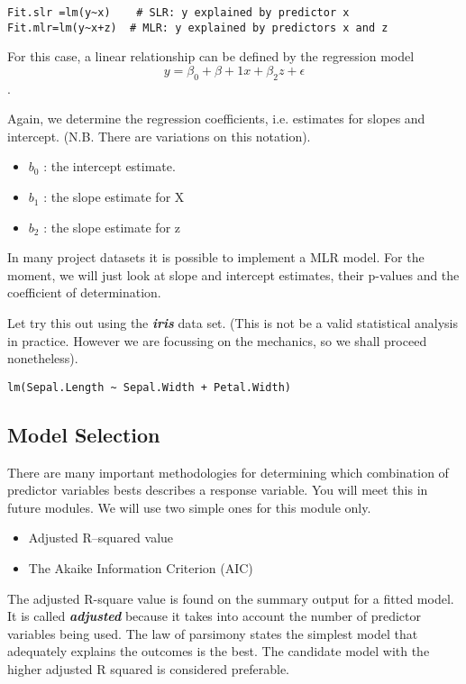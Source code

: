 \documentclass[a4paper,12pt]{article}
\begin{document}
\begin{framed}
\begin{verbatim}
Fit.slr =lm(y~x)  	# SLR: y explained by predictor x
Fit.mlr=lm(y~x+z)  # MLR: y explained by predictors x and z
\end{verbatim}
\end{framed}

For this case, a  linear relationship can be defined by the regression model  \[y =\beta_0 + \beta+1x + \beta_2z + \epsilon\].

Again, we determine the regression coefficients, i.e. estimates for slopes and intercept. (N.B. There are variations on this notation).

\begin{itemize}
\item	$b_0$ : the intercept estimate.
\item	$b_1$  : the slope estimate for X
\item	$b_2$  : the slope estimate for z
\end{itemize}

In many project datasets it is possible to implement a MLR model. For the moment, we will just look at slope and intercept estimates, their p-values and the coefficient of determination.

Let try this out using the \textbf{\textit{iris}} data set. (This is not be a valid statistical analysis in practice. However we are focussing on the mechanics, so we shall proceed nonetheless).
\begin{framed}
\begin{verbatim}
lm(Sepal.Length ~ Sepal.Width + Petal.Width)
\end{verbatim}
\end{framed}



\subsection{Model Selection}
There are many important methodologies for determining which combination of predictor variables bests describes a response variable. You will meet this in future modules.
We will use two simple ones for this module only.
\begin{itemize}
\item Adjusted R–squared value
\item The Akaike Information Criterion (AIC)
\end{itemize}


The adjusted R-square value is found on the summary output for a fitted model. It is called \textbf{\emph{adjusted}} because it takes into account the number of predictor variables being used. The law of parsimony states the simplest model that adequately explains the outcomes is the best. The candidate model with the higher adjusted R squared is considered preferable.
\end{document}
